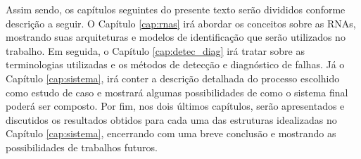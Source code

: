Assim sendo, os capítulos seguintes do presente texto serão divididos conforme
descrição a seguir. O Capítulo \ref{cap:rnas} irá abordar os conceitos sobre as
RNAs, mostrando suas arquiteturas e modelos de identificação que serão
utilizados no trabalho. Em seguida, o Capítulo \ref{cap:detec_diag} irá tratar
sobre as terminologias utilizadas e os métodos de detecção e diagnóstico de
falhas. Já o Capítulo \ref{cap:sistema}, irá conter a descrição detalhada do
processo escolhido como estudo de caso e mostrará algumas possibilidades de como
o sistema final poderá ser composto. Por fim, nos dois últimos capítulos, serão
apresentados e discutidos os resultados obtidos para cada uma das estruturas
idealizadas no Capítulo \ref{cap:sistema}, encerrando com uma breve conclusão e
mostrando as possibilidades de trabalhos futuros.
